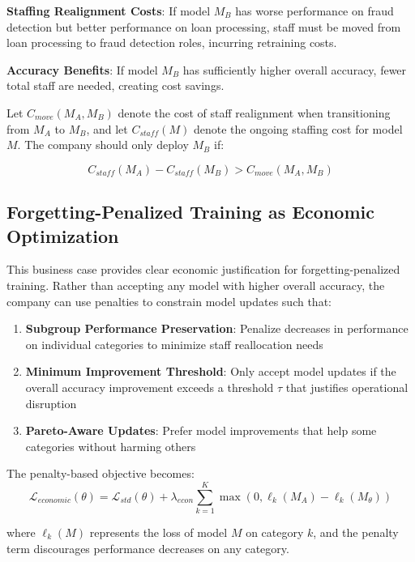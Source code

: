 \documentclass[12pt, letterpaper]{article}
\theoremstyle{remark}
\begin{document}
\textbf{Staffing Realignment Costs}: If model $M_B$ has worse performance on fraud detection but better performance on loan processing, staff must be moved from loan processing to fraud detection roles, incurring retraining costs.

\textbf{Accuracy Benefits}: If model $M_B$ has sufficiently higher overall accuracy, fewer total staff are needed, creating cost savings.

Let $C_{move}(M_A, M_B)$ denote the cost of staff realignment when transitioning from $M_A$ to $M_B$, and let $C_{staff}(M)$ denote the ongoing staffing cost for model $M$. The company should only deploy $M_B$ if:

\begin{equation}
C_{staff}(M_A) - C_{staff}(M_B) > C_{move}(M_A, M_B)
\end{equation}

\subsection{Forgetting-Penalized Training as Economic Optimization}

This business case provides clear economic justification for forgetting-penalized training. Rather than accepting any model with higher overall accuracy, the company can use penalties to constrain model updates such that:

\begin{enumerate}
\item \textbf{Subgroup Performance Preservation}: Penalize decreases in performance on individual categories to minimize staff reallocation needs
\item \textbf{Minimum Improvement Threshold}: Only accept model updates if the overall accuracy improvement exceeds a threshold $\tau$ that justifies operational disruption
\item \textbf{Pareto-Aware Updates}: Prefer model improvements that help some categories without harming others
\end{enumerate}

The penalty-based objective becomes:
\begin{equation}
\mathcal{L}_{economic}(\theta) = \mathcal{L}_{std}(\theta) + \lambda_{econ} \sum_{k=1}^K \max(0, \ell_k(M_A) - \ell_k(M_\theta))
\end{equation}

where $\ell_k(M)$ represents the loss of model $M$ on category $k$, and the penalty term discourages performance decreases on any category.
\end{document}
